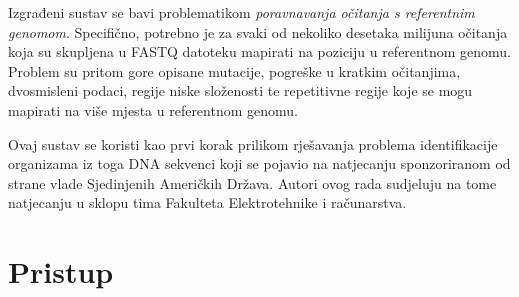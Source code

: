 \documentclass[times, utf8, diplomski]{fer}
\begin{document}
Izgrađeni sustav se bavi problematikom \emph{poravnavanja očitanja s referentnim genomom}. Specifično, potrebno
je za svaki od nekoliko desetaka milijuna očitanja koja su skupljena u FASTQ datoteku mapirati na poziciju u
referentnom genomu. Problem su pritom gore opisane mutacije, pogreške u kratkim očitanjima, dvosmisleni podaci,
regije niske složenosti te repetitivne regije koje se mogu mapirati na više mjesta u referentnom genomu.

Ovaj sustav se koristi kao prvi korak prilikom rješavanja problema identifikacije organizama iz toga DNA sekvenci
koji se pojavio na natjecanju sponzoriranom od strane vlade Sjedinjenih Američkih Država. Autori ovog rada sudjeluju
na tome natjecanju u sklopu tima Fakulteta Elektrotehnike i računarstva.





\chapter{Pristup}
\end{document}
